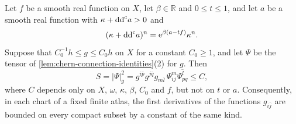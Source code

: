 \begin{lemma}\label{lem:penalized-third-order}
Let $f$ be a smooth real function on $X$, let $\beta\in\mathbb R$ and $0\leq t\leq1$, and let $a$ be a smooth real function with $\kappa+\mathrm{dd}^{\mathrm{c}} a>0$ and
\[
 (\kappa+\mathrm{dd}^{\mathrm{c}} a)^n=\mathrm e^{\beta(a-tf)}\kappa^n.
\]
Suppose that $C_0^{-1}h\leq g\leq C_0h$ on $X$ for a constant $C_0\geq1$, and let $\Psi$ be the tensor of \cref{lem:chern-connection-identities}(2) for $g$. Then
\[
 S=|\Psi|_g^2=g^{i\bar p}g^{j\bar q}g_{m\bar l}\,\Psi^m_{ij}\overline{\Psi^l_{pq}}\leq C,
\]
where $C$ depends only on $X$, $\omega$, $\kappa$, $\beta$, $C_0$ and $f$, but not on $t$ or $a$. Consequently, in each chart of a fixed finite atlas, the first derivatives of the functions $g_{i\bar j}$ are bounded on every compact subset by a constant of the same kind.
\end{lemma}
